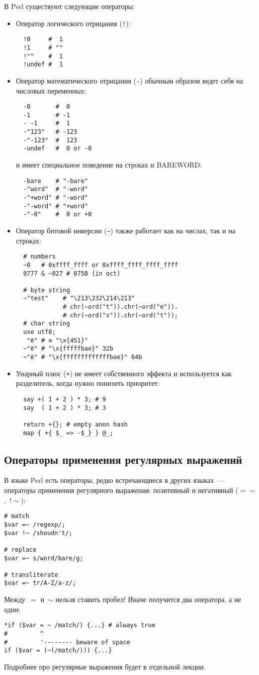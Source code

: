 В Perl существуют следующие операторы:
\begin{itemize}
  \item Оператор логического отрицания (\verb|!|):
  \begin{verbatim}
  !0     #  1
  !1     # ""
  !""    #  1
  !undef #  1
  \end{verbatim}
  \item Оператор математического отрицания (\verb|-|) обычным образом ведет себя на числовых переменных:
  \begin{verbatim}
  -0       #  0
  -1       # -1
  - -1     #  1
  -"123"   # -123
  -"-123"  #  123
  -undef   #  0 or -0
  \end{verbatim}
  и имеет специальное поведение на строках и BAREWORD:
  \begin{verbatim}
  -bare    # "-bare"
  -"word"  # "-word"
  -"+word" # "-word"
  -"-word" # "+word"
  -"-0"    #  0 or +0
  \end{verbatim}

  \item Оператор битовой инверсии (\verb|~|) также работает как на числах, так и на строках:
  \begin{verbatim}
  # numbers
  ~0   # 0xffff_ffff or 0xffff_ffff_ffff_ffff
  0777 & ~027 # 0750 (in oct)

  # byte string
  ~"test"    # "\213\232\214\213"
             # chr(~ord("t")).chr(~ord("e")).
             # chr(~ord("s")).chr(~ord("t"));
  # char string
  use utf8;
   "ё" # ≡ "\x{451}"
  ~"ё" # "\x{fffffbae}" 32b
  ~"ё" # "\x{fffffffffffffbae}" 64b
  \end{verbatim}
  \item Унарный плюс (\verb|+|) не имеет собственного эффекта и используется как разделитель, когда нужно понизить приоритет:
  \begin{verbatim}
  say +( 1 + 2 ) * 3; # 9
  say  ( 1 + 2 ) * 3; # 3

  return +{}; # empty anon hash
  map { +{ $_ => -$_} } @_;
  \end{verbatim}
\end{itemize}

\subsection{Операторы применения регулярных выражений} %
В языке Perl есть операторы, редко встречающиеся в других языках~--- операторы применения регулярного выражения: позитивный и негативный ($=\sim$,~$!\sim$):
\begin{verbatim}
# match
$var =~ /regexp/;
$var !~ /shoudn't/;

# replace
$var =~ s/word/bare/g;

# transliterate
$var =~ tr/A-Z/a-z/;
\end{verbatim}
Между~$=$ и~$\sim$ нельзя ставить пробел! Иначе получится два оператора, а не один:
\begin{verbatim}
*if ($var = ~ /match/) {...} # always true
#         ^
#         '-------- beware of space
if ($var = (~(/match/))) {...}
\end{verbatim}
Подробнее про регулярные выражения будет в отдельной лекции.

